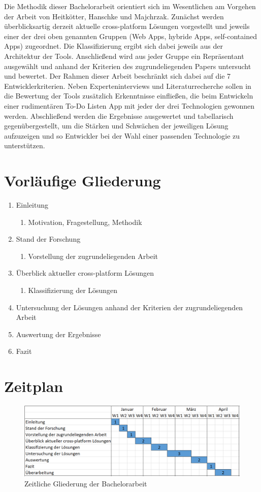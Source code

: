 Die Methodik dieser Bachelorarbeit orientiert sich im Wesentlichen am Vorgehen der Arbeit von Heitkötter, Hanschke und Majchrzak. Zunächst werden überblicksartig derzeit aktuelle cross-platform Lösungen vorgestellt und jeweils einer der drei oben genannten Gruppen (Web Apps, hybride Apps, self-contained Apps) zugeordnet. Die Klassifizierung ergibt sich dabei jeweils aus der Architektur der Tools.
Anschließend wird aus jeder Gruppe ein Repräsentant ausgewählt und anhand der Kriterien des zugrundeliegenden Papers untersucht und bewertet. Der Rahmen dieser Arbeit beschränkt sich dabei auf die 7 Entwicklerkriterien.
Neben Experteninterviews und Literaturrecherche sollen in die Bewertung der Tools zusätzlich Erkenntnisse einfließen, die beim Entwickeln einer rudimentären To-Do Listen App mit jeder der drei Technologien gewonnen werden.
Abschließend werden die Ergebnisse ausgewertet und tabellarisch gegenübergestellt, um die Stärken und Schwächen der jeweiligen Lösung aufzuzeigen und so Entwickler bei der Wahl einer passenden Technologie zu unterstützen.

\section*{Vorläufige Gliederung}

\begin{enumerate}
\item Einleitung
\begin{enumerate}[label*=\arabic*.]
\item Motivation, Fragestellung, Methodik
\end{enumerate}
\item Stand der Forschung
\begin{enumerate}[label*=\arabic*.]
\item Vorstellung der zugrundeliegenden Arbeit
\end{enumerate}
\item Überblick aktueller cross-platform Lösungen
\begin{enumerate}[label*=\arabic*.]
\item Klassifizierung der Lösungen
\end{enumerate}
\item Untersuchung der Lösungen anhand der Kriterien der zugrundeliegenden Arbeit
\item Auswertung der Ergebnisse
\item Fazit 
\end{enumerate}

 \section*{Zeitplan}
 \begin{figure}[H]
	\renewcommand*\figurename{Abbildung}
		\begin{center}
			\includegraphics[width=1\textwidth]{timetable.png}
		\end{center}
		\caption{Zeitliche Gliederung der Bachelorarbeit}
	\end{figure}